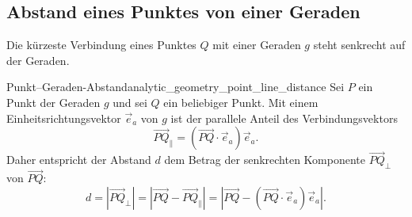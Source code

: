 \subsection{Abstand eines Punktes von einer Geraden}
\label{subsec:analytic_geometry_point_to_line_distance}

Die kürzeste Verbindung eines Punktes $Q$ mit einer Geraden $g$ steht
senkrecht auf der Geraden.

\begin{center}
\end{center}

\begin{TheoremBox}{Punkt--Geraden-Abstand}{analytic_geometry_point_line_distance}
  Sei $P$ ein Punkt der Geraden $g$ und sei $Q$ ein beliebiger Punkt. Mit
  einem Einheitsrichtungsvektor $\vec e_a$ von $g$ ist der parallele Anteil
  des Verbindungsvektors
  \[
    \overrightarrow{PQ}_{\parallel}
    =(\overrightarrow{PQ}\cdot\vec e_a)\vec e_a.
  \]
  Daher entspricht der Abstand $d$ dem Betrag der senkrechten Komponente
  $\overrightarrow{PQ}_{\perp}$ von $\overrightarrow{PQ}$:
  \[
    d
    =\left\lvert\overrightarrow{PQ}_{\perp}\right\rvert
    =\left\lvert
      \overrightarrow{PQ}-\overrightarrow{PQ}_{\parallel}
    \right\rvert
    =\left\lvert
      \overrightarrow{PQ}-(\overrightarrow{PQ}\cdot\vec e_a)\vec e_a
    \right\rvert.
  \]
\end{TheoremBox}

